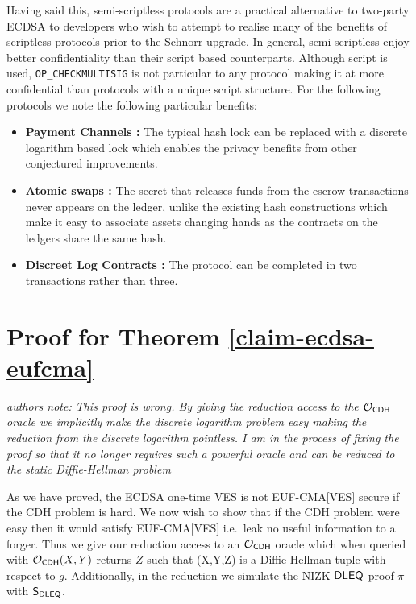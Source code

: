 \documentclass[fullpage]{article}
\theoremstyle{definition}
\newcommand{\EUFCMAVES}{\textsf{EUF-CMA}[\textsf{VES}]\xspace}
\newcommand{\OPCHECKMULTISIG}{\texttt{OP\_CHECKMULTISIG}\xspace}
\begin{document}
Having said this, semi-scriptless protocols are a practical alternative to two-party ECDSA to developers who wish to attempt to realise many of the benefits of scriptless protocols prior to the Schnorr upgrade. In general, semi-scriptless enjoy better confidentiality than their script based counterparts. Although script is used, \OPCHECKMULTISIG is not particular to any protocol making it at more confidential than protocols with a unique script structure. For the following protocols we note the following particular benefits:

\begin{itemize}
    \item \textbf{Payment Channels \cite{poon2016bitcoin}:} The typical hash lock can be replaced with a discrete logarithm based lock which enables the privacy benefits from \cite{cryptoeprint:2018:472} other conjectured improvements\cite{lightning-dev-scriptless-scripts}.
    \item \textbf{Atomic swaps \cite{scriptless-atomic-swap}:} The secret that releases funds from the escrow transactions never appears on the ledger, unlike the existing hash constructions which make it easy to associate assets changing hands as the contracts on the ledgers share the same hash.
    \item \textbf{Discreet Log Contracts \cite{dryja2017discreet}:} The protocol can be completed in two transactions rather than three.
\end{itemize}

\FloatBarrier
{}


\appendix
\section{ Proof for Theorem \ref{claim-ecdsa-eufcma}}

\newcommand{\Ocdh}{\mathcal{O}_{\CDH}}
\newcommand{\betarange}{\mathbb{B}}
\newcommand{\Sdleq}{\pcalgostyle{S}_{\DLEQ}}

\emph{authors note: This proof is wrong. By giving the reduction access to the
  $\Ocdh$ oracle we implicitly make the discrete logarithm problem
  easy\cite{Kushwaha16} making the reduction from the discrete logarithm
  pointless. I am in the process of fixing the proof so that it no longer
  requires such a powerful oracle and can be reduced to the static
  Diffie-Hellman problem \cite{SDHP}}

\label{proof-ecdsa-eufcma}
As we have proved, the ECDSA one-time VES is not \EUFCMAVES secure if the CDH problem is hard. We now wish to show that if the CDH problem were easy then it would satisfy \EUFCMAVES i.e.\ leak no useful information to a forger. Thus we give our reduction access to an $\Ocdh$ oracle which when queried with $\Ocdh(X,Y)$ returns $Z$ such that (X,Y,Z) is a Diffie-Hellman tuple with respect to $g$. Additionally, in the reduction we simulate the NIZK $\textsf{DLEQ}$ proof $\pi$ with $\Sdleq$.
\end{document}
